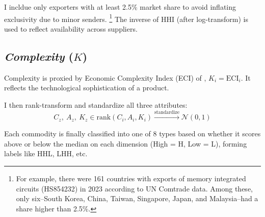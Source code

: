 \documentclass[12pt]{article}
\begin{document}
I incldue only exporters with at least 2.5\% market share to avoid inflating exclusivity due to minor senders. \footnote{For example, there were 161 countries with exports of memory integrated circuits (HS854232) in 2023 according to UN Comtrade data. Among these, only six--South Korea, China, Taiwan, Singapore, Japan, and Malaysia--had a share higher than 2.5\%.} The inverse of HHI (after log-transform) is used to reflect availability across suppliers.
  
\subsection*{\textit{Complexity} ($K$)}
Complexity is proxied by Economic Complexity Index (ECI) of \textcite{hausmann2014atlas}, $K_i = \text{ECI}_i$. It reflects the technological sophistication of a product.

I then rank-transform and standardize all three attributes:
\begin{equation}
C_z, \ A_z, \ K_z \in \text{rank}(C_i, A_i, K_i) \xrightarrow{\text{standardize}} \mathcal{N}(0, 1)
\end{equation}

Each commodity is finally classified into one of 8 types based on whether it scores above or below the median on each dimension (High = H, Low = L), forming labels like HHL, LHH, etc.

\vspace{1em}

\begin{table}[H]
\small
\centering
\caption{Selected HS6-Level Commodities and Cubelet Classification (2020)}
\end{table}
\end{document}
